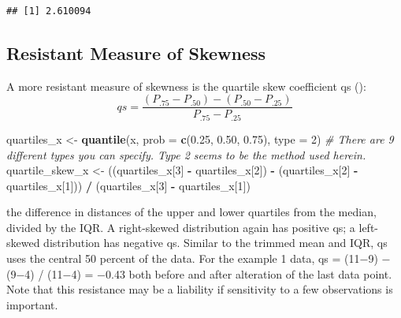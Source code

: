\documentclass[]{book}
\newenvironment{Shaded}{\begin{snugshade}}{\end{snugshade}}
\newcommand{\CommentTok}[1]{\textcolor[rgb]{0.56,0.35,0.01}{\textit{#1}}}
\newcommand{\DataTypeTok}[1]{\textcolor[rgb]{0.13,0.29,0.53}{#1}}
\newcommand{\DecValTok}[1]{\textcolor[rgb]{0.00,0.00,0.81}{#1}}
\newcommand{\FloatTok}[1]{\textcolor[rgb]{0.00,0.00,0.81}{#1}}
\newcommand{\KeywordTok}[1]{\textcolor[rgb]{0.13,0.29,0.53}{\textbf{#1}}}
\newcommand{\NormalTok}[1]{#1}
\newcommand{\OperatorTok}[1]{\textcolor[rgb]{0.81,0.36,0.00}{\textbf{#1}}}
\newcommand{\StringTok}[1]{\textcolor[rgb]{0.31,0.60,0.02}{#1}}
\begin{document}
\begin{verbatim}
## [1] 2.610094
\end{verbatim}

\hypertarget{resistant-measure-of-skewness}{%
\subsection{Resistant Measure of Skewness}\label{resistant-measure-of-skewness}}

A more resistant measure of skewness is the quartile skew coefficient qs (\citet{kenney_mathematics_1954}):
\begin{equation}
qs = \frac{(P_{.75}-P_{.50})-(P_{.50}-P_{.25})}{P_{.75}-P_{.25}}
\label{eq:1-11}
\end{equation}

\begin{Shaded}
\begin{Highlighting}[]
\NormalTok{quartiles_x <-}\StringTok{ }\KeywordTok{quantile}\NormalTok{(x, }\DataTypeTok{prob =} \KeywordTok{c}\NormalTok{(}\FloatTok{0.25}\NormalTok{, }\FloatTok{0.50}\NormalTok{, }\FloatTok{0.75}\NormalTok{), }\DataTypeTok{type =} \DecValTok{2}\NormalTok{)}
\CommentTok{# There are 9 different types you can specify. Type 2 seems to be the method used herein.}
\NormalTok{quartile_skew_x <-}\StringTok{ }\NormalTok{((quartiles_x[}\DecValTok{3}\NormalTok{] }\OperatorTok{-}\StringTok{ }\NormalTok{quartiles_x[}\DecValTok{2}\NormalTok{]) }\OperatorTok{-}\StringTok{ }\NormalTok{(quartiles_x[}\DecValTok{2}\NormalTok{] }\OperatorTok{-}\StringTok{ }\NormalTok{quartiles_x[}\DecValTok{1}\NormalTok{])) }\OperatorTok{/}\StringTok{ }\NormalTok{(quartiles_x[}\DecValTok{3}\NormalTok{] }\OperatorTok{-}\StringTok{ }\NormalTok{quartiles_x[}\DecValTok{1}\NormalTok{])}
\end{Highlighting}
\end{Shaded}

the difference in distances of the upper and lower quartiles from the median, divided by the IQR. A right-skewed distribution again has positive qs; a left-skewed distribution has negative qs. Similar to the trimmed mean and IQR, qs uses the central 50 percent of the data. For the example 1 data, qs = (11−9) − (9−4) / (11−4) = −0.43 both before and after alteration of the last data point. Note that this resistance may be a liability if sensitivity to a few observations is important.
\end{document}
